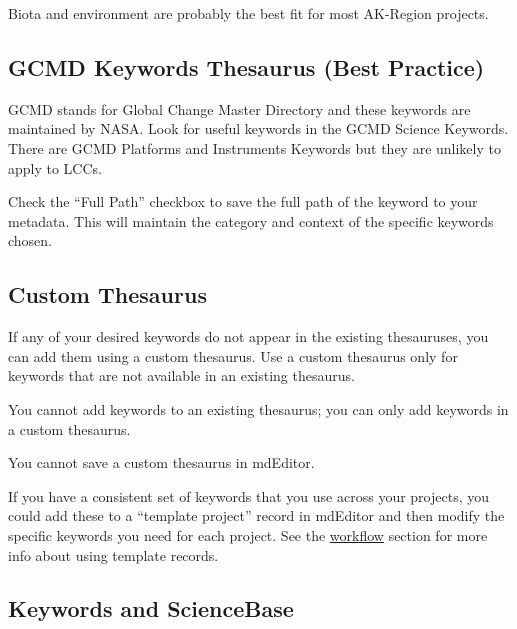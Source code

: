 \documentclass[
]{book}
\makeatletter
\newenvironment{kframe}{%
\medskip{}
\setlength{\fboxsep}{.8em}
 \def\at@end@of@kframe{}%
 \ifinner\ifhmode%
  \def\at@end@of@kframe{\end{minipage}}%
  \begin{minipage}{\columnwidth}%
 \fi\fi%
 \def\FrameCommand##1{\hskip\@totalleftmargin \hskip-\fboxsep
 \colorbox{shadecolor}{##1}\hskip-\fboxsep
     \hskip-\linewidth \hskip-\@totalleftmargin \hskip\columnwidth}%
 \MakeFramed {\advance\hsize-\width
   \@totalleftmargin\z@ \linewidth\hsize
   \@setminipage}}%
 {\par\unskip\endMakeFramed%
 \at@end@of@kframe}
\newenvironment{rmdblock}[1]
  {
  \begin{itemize}
  \renewcommand{\labelitemi}{
    \raisebox{-.7\height}[0pt][0pt]{
      {\setkeys{Gin}{width=3em,keepaspectratio}\texttt{[image: images/\#1]}}
    }
  }
  \setlength{\fboxsep}{1em}
  \begin{kframe}
  \item
  }
  {
  \end{kframe}
  \end{itemize}
  }
\newenvironment{rmdtip}
  {\begin{rmdblock}{tip}}
  {\end{rmdblock}}
\makeatother
\begin{document}
\begin{rmdtip}
Biota and environment are probably the best fit for most AK-Region
projects.
\end{rmdtip}

\hypertarget{gcmd-keywords-thesaurus-best-practice}{%
\subsection{GCMD Keywords Thesaurus (Best Practice)}\label{gcmd-keywords-thesaurus-best-practice}}

GCMD stands for Global Change Master Directory and these keywords are maintained by NASA. Look for useful keywords in the GCMD Science Keywords. There are GCMD Platforms and Instruments Keywords but they are unlikely to apply to LCCs.

\begin{rmdtip}
Check the ``Full Path'' checkbox to save the full path of the keyword to
your metadata. This will maintain the category and context of the
specific keywords chosen.
\end{rmdtip}

\hypertarget{custom-thesaurus}{%
\subsection{Custom Thesaurus}\label{custom-thesaurus}}

If any of your desired keywords do not appear in the existing thesauruses, you can add them using a custom thesaurus. Use a custom thesaurus only for keywords that are not available in an existing thesaurus.

You cannot add keywords to an existing thesaurus; you can only add keywords in a custom thesaurus.

You cannot save a custom thesaurus in mdEditor.

\begin{rmdtip}
If you have a consistent set of keywords that you use across your
projects, you could add these to a ``template project'' record in
mdEditor and then modify the specific keywords you need for each
project. See the \protect\hyperlink{workflow}{workflow} section for more
info about using template records.
\end{rmdtip}

\hypertarget{keywords-and-sciencebase}{%
\subsection{Keywords and ScienceBase}\label{keywords-and-sciencebase}}
\end{document}
